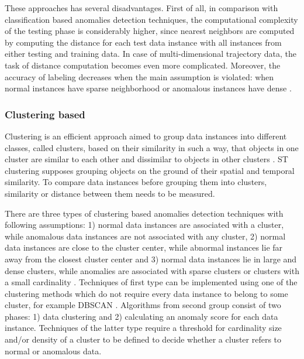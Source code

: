 These approaches has several disadvantages. First of all, in comparison with classification based anomalies detection techniques, the computational complexity of the testing phase is considerably higher, since nearest neighbors are computed by computing the distance for each test data instance with all instances from either testing and training data. In case of multi-dimensional trajectory data, the task of distance computation becomes even more complicated. Moreover, the accuracy of labeling decreases when the main assumption is violated: when normal instances have sparse neighborhood or anomalous instances have dense \cite{article:15_survey_ad}.

\subsubsection{Clustering based}

Clustering is an efficient approach aimed to group data instances into different classes, called clusters, based on their similarity in such a way, that objects in one cluster are similar to each other and dissimilar to objects in other clusters \cite{article:8_review_mot_cl_alg}\cite{article:22_survey_dscc}. ST clustering supposes grouping objects on the ground of their spatial and temporal similarity. To compare data instances before grouping them into clusters, similarity or distance between them needs to be measured.

There are three types of clustering based anomalies detection techniques with following assumptions: 1) normal data instances are associated with a cluster, while anomalous data instances are not associated with any cluster, 2) normal data instances are close to the cluster center, while abnormal instances lie far away from the closest cluster center and 3) normal data instances lie in large and dense clusters, while anomalies are associated with sparse clusters or clusters with a small cardinality \cite{article:15_survey_ad}\cite{article:6_survey_anom_det_rtuvs}. Techniques of first type can be implemented using one of the clustering methods which do not require every data instance to belong to some cluster, for example DBSCAN \cite{inproceedings:20_dbscan}. Algorithms from second group consist of two phases: 1) data clustering and 2) calculating an anomaly score for each data instance. Techniques of the latter type require a threshold for cardinality size and/or density of a cluster to be defined to decide whether a cluster refers to normal or anomalous data.


